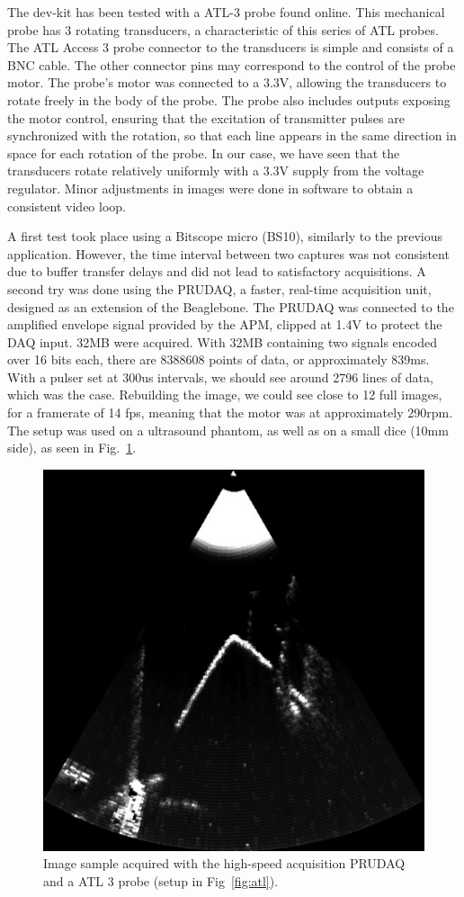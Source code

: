 \documentclass[letterpaper, 10 pt, conference]{ieeeconf} %
\begin{document}
The dev-kit has been tested with a ATL-3 probe found online. This mechanical probe has 3 rotating transducers, a characteristic of this series of ATL probes. The ATL Access 3 probe connector to the transducers is simple and consists of a BNC cable. The other connector pins may correspond to the control of the probe motor. The probe's motor was connected to a 3.3V, allowing the transducers to rotate freely in the body of the probe. The probe also includes outputs exposing the motor control, ensuring that the excitation of transmitter pulses are synchronized with the rotation, so that each line appears in the same direction in space for each rotation of the probe. In our case, we have seen that the transducers rotate relatively uniformly with a 3.3V supply from the voltage regulator. Minor adjustments in images were done in software to obtain a consistent video loop.

A first test took place using a Bitscope micro (BS10), similarly to the previous application. However, the time interval between two captures was not consistent due to buffer transfer delays and did not lead to satisfactory acquisitions. A second try was done using the PRUDAQ, a faster, real-time acquisition unit, designed as an extension of the Beaglebone. The PRUDAQ was connected to the amplified envelope signal provided by the APM, clipped at 1.4V to protect the DAQ input. 32MB were acquired. With 32MB containing two signals encoded over 16 bits each, there are 8388608 points of data, or approximately 839ms. With a pulser set at 300us intervals, we should see around 2796 lines of data, which was the case. Rebuilding the image, we could see close to 12 full images, for a framerate of 14 fps, meaning that the motor was at approximately 290rpm. The setup was used on a ultrasound phantom, as well as on a small dice (10mm side), as seen in Fig.~\ref{fig:retroATL}.

\begin{figure}%
\centering
\includegraphics[width=.8\linewidth]{sonde3V}
\caption{Image sample acquired with the high-speed acquisition PRUDAQ and a ATL 3 probe (setup in Fig~\ref{fig:atl}).}
\label{fig:retroATL}
\end{figure}
\end{document}
